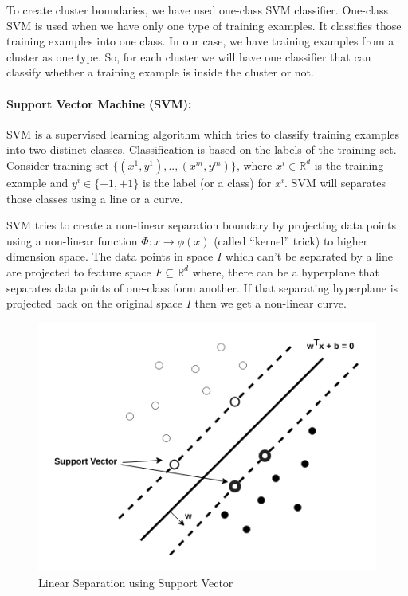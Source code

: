 \documentclass[12pt,oneside,a4paper]{article}
\begin{document}
To create cluster boundaries, we have used one-class SVM classifier. One-class SVM is used when we have only one type of training examples. It classifies those training examples into one class. In our case, we have training examples from a cluster as one type. So, for each cluster we will have one classifier that can classify whether a training example is inside the cluster or not.

\paragraph{Support Vector Machine (SVM):}

SVM is a supervised learning algorithm which tries to classify training examples into two distinct classes. Classification is based on the labels of the training set.
Consider training set $\{(x^{1},y^{1}), .., (x^{m},y^{m})\}$, where $x^{i} \in \mathbb{R}^d$ is the training example and $y^{i} \in \{-1, +1\}$ is the label (or a class) for $x^{i}$. SVM will separates those classes using a line or a curve.

SVM tries to create a non-linear separation boundary by projecting data points using a non-linear function $\Phi:x \rightarrow \phi(x)$ (called ``kernel'' trick) to higher dimension space. The data points in space $I$ which can't be separated by a line are projected to feature space $F \subseteq \mathbb{R}^d$ where, there can be a hyperplane that separates data points of one-class form another. If that separating hyperplane is projected back on the original space $I$ then we get a non-linear curve.\cite{svm}

\begin{figure}[H]
\centering
\includegraphics[scale=0.5]{SVM.png}
\caption{Linear Separation using Support Vector} \label{fig:SVM}
\end{figure}
\end{document}
